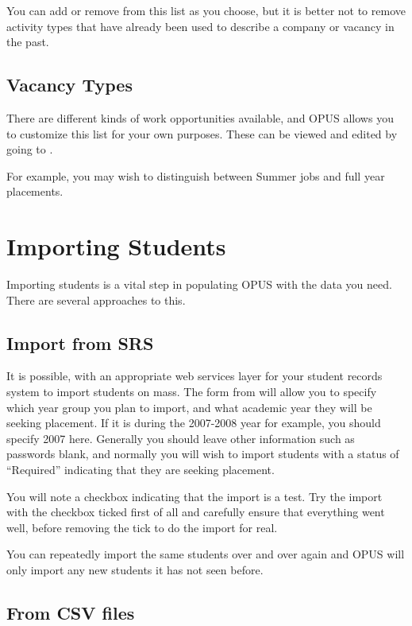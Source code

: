 \documentclass[12 pt]{book}
\begin{document}
You can add or remove from this list as you choose, but it is better not to
remove activity types that have already been used to describe a company or
vacancy in the past.

\section{Vacancy Types}
\label{VacancyTypes}

There are different kinds of work opportunities available, and OPUS allows you
to customize this list for your own purposes. These can be viewed and edited
by going to .

For example, you may wish to distinguish between Summer jobs and full year
placements.


\chapter{Importing Students}

Importing students is a vital step in populating OPUS with the data you need. There are several
approaches to this.

\section{Import from SRS}

It is possible, with an appropriate web services layer for your student records system to import
students on mass. The form from  will allow
you to specify which year group you plan to import, and what academic year they will be seeking
placement. If it is during the 2007-2008 year for example, you should specify 2007 here. Generally
you should leave other information such as passwords blank, and normally you will wish to
import students with a status of ``Required'' indicating that they are seeking placement.

You will note a checkbox indicating that the import is a test. Try the import with the checkbox
ticked first of all and carefully ensure that everything went well, before removing the tick
to do the import for real.

You can repeatedly import the same students over and over again and OPUS will only import
any new students it has not seen before.

\section{From CSV files}
\end{document}
